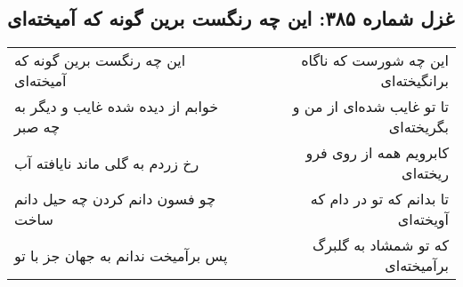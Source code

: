 \begin{center}
\section*{غزل شماره ۳۸۵: این چه رنگست برین گونه که آمیخته‌ای}
\label{sec:385}
\begin{longtable}{l p{0.5cm} r}
این چه رنگست برین گونه که آمیخته‌ای
&&
این چه شورست که ناگاه برانگیخته‌ای
\\
خوابم از دیده شده غایب و دیگر به چه صبر
&&
تا تو غایب شده‌ای از من و بگریخته‌ای
\\
رخ زردم به گلی ماند نایافته آب
&&
کابرویم همه از روی فرو ریخته‌ای
\\
چو فسون دانم کردن چه حیل دانم ساخت
&&
تا بدانم که تو در دام که آویخته‌ای
\\
پس برآمیخت ندانم به جهان جز با تو
&&
که تو شمشاد به گلبرگ برآمیخته‌ای
\\
\end{longtable}
\end{center}
